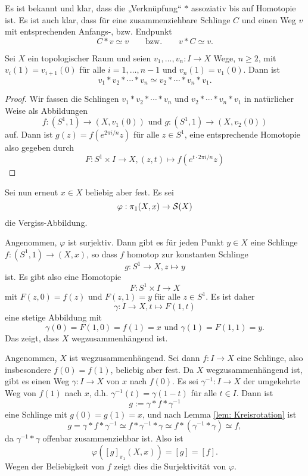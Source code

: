 \documentclass[a4paper,10pt]{article}
\begin{document}
\begin{bem}
 Es ist bekannt und klar, dass die „Verknüpfung“ $*$ assoziativ bis auf Homotopie ist. Es ist auch klar, dass für eine zusammenziehbare Schlinge $C$ und einen Weg $v$ mit entsprechenden Anfangs-, bzw. Endpunkt
 \[
  C * v \simeq v \qquad \text{bzw.} \qquad v * C \simeq v.
 \]
\end{bem}

\begin{lem}\label{lem: Kreisrotation}
 Sei $X$ ein topologischer Raum und seien $v_1, \ldots, v_n : I \to X$ Wege, $n \geq 2$, mit $v_i(1) = v_{i+1}(0)$ für alle $i=1,\ldots,n-1$ und $v_n(1) = v_1(0)$. Dann ist
 \[
  v_1 * v_2 * \cdots * v_n \simeq v_2 * \cdots * v_n * v_1.
 \]
\end{lem}
\begin{proof}
 Wir fassen die Schlingen $v_1 * v_2 * \cdots * v_n$ und $v_2 * \cdots * v_n * v_1$ in natürlicher Weise als Abbildungen
 \[
  f : (S^1, 1) \to (X, v_1(0)) \text{ und } g : (S^1,1) \to (X,v_2(0))
 \]
 auf. Dann ist $g(z) = f(e^{2\pi i/n}z)$ für alle $z \in S^1$, eine entsprechende Homotopie also gegeben durch
 \[
  F : S^1 \times I \to X, (z,t) \mapsto f\left( e^{t \cdot 2\pi i/n} z \right)
 \]
\end{proof}

Sei nun erneut $x \in X$ beliebig aber fest. Es sei
\[
 \varphi : \pi_1(X,x) \to \mathcal{S}(X)
\]
die Vergiss-Abbildung.

Angenommen, $\varphi$ ist surjektiv. Dann gibt es für jeden Punkt $y \in X$ eine Schlinge $f : (S^1, 1) \to (X,x)$, so dass $f$ homotop zur konstanten Schlinge
\[
 g : S^1 \to X, z \mapsto y
\]
ist. Es gibt also eine Homotopie
\[
 F : S^1 \times I \to X
\]
mit $F(z,0) = f(z)$ und $F(z,1) = y$ für alle $z \in S^1$. Es ist daher
\[
 \gamma : I \to X, t \mapsto F(1,t)
\]
eine stetige Abbildung mit
\[
 \gamma(0) = F(1,0) = f(1) = x \text{ und } \gamma(1) = F(1,1) = y.
\]
Das zeigt, dass $X$ wegzusammenhängend ist.

Angenommen, $X$ ist wegzusammenhängend. Sei dann $f : I \to X$ eine Schlinge, also insbesondere $f(0) = f(1)$, beliebig aber fest. Da $X$ wegzusammenhängend ist, gibt es einen Weg $\gamma: I \to X$ von $x$ nach $f(0)$. Es sei $\gamma^{-1} : I \to X$ der umgekehrte Weg von $f(1)$ nach $x$, d.h. $\gamma^{-1}(t) = \gamma(1-t)$ für alle $t \in I$. Dann ist
\[
 g := \gamma * f * \gamma^{-1}
\]
eine Schlinge mit $g(0) = g(1) = x$, und nach Lemma \ref{lem: Kreisrotation} ist
\[
 g = \gamma * f * \gamma^{-1} \simeq f * \gamma^{-1} * \gamma \simeq f * (\gamma^{-1} * \gamma) \simeq f,
\]
da $\gamma^{-1} * \gamma$ offenbar zusammenziehbar ist. Also ist
\[
 \varphi([g]_{\pi_1}(X,x)) = [g] = [f].
\]
Wegen der Beliebigkeit von $f$ zeigt dies die Surjektivität von $\varphi$.
\end{document}
